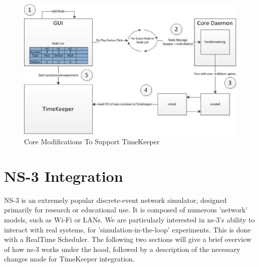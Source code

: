\begin{figure}[t] 
      \includegraphics[width=\textwidth]{images/coreContainerCreation.eps} 
    \caption{Core Modifications To Support TimeKeeper} 
    \label{fig:coreContainerCreation} 
  \end{figure}

\section{NS-3 Integration}
NS-3 is an extremely popular discrete-event network simulator, designed primarily for research or educational use. It is composed of numerous 'network' models, such as Wi-Fi or LANs. We are particularly interested in ns-3's ability to interact with real systems, for 'simulation-in-the-loop' experiments. This is done with a RealTime Scheduler. The following two sections will give a brief overview of how ns-3 works under the hood, followed by a description of the necessary changes made for TimeKeeper integration. 
